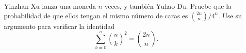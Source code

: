 \begin{statement}{22}
  Yinzhan Xu lanza una moneda $n$ veces, y tambi\'en Yuhao Du.
  Pruebe que la probabilidad de que ellos tengan el mismo n\'umero de caras es
  $\binom{2n}{n}/4^n$.
  Use su argumento para verificar la identidad
  \[
    \sum_{k = 0}^n \binom{n}{k}^2 = \binom{2n}{n}.
  \]
\end{statement}